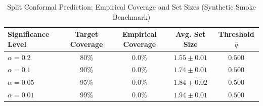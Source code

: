 \begin{table}[h]
\centering
\caption{Split Conformal Prediction: Empirical Coverage and Set Sizes (Synthetic Smoke Benchmark)}
\label{tab:conformal}
\begin{tabular}{lcccc}
\toprule
Significance Level & Target Coverage & Empirical Coverage & Avg. Set Size & Threshold $\hat{q}$ \\
\midrule
$\alpha=0.2$ & 80\% & $0.0\%$ & $1.55 \pm 0.01$ & $0.500$ \\
$\alpha=0.1$ & 90\% & $0.0\%$ & $1.74 \pm 0.01$ & $0.500$ \\
$\alpha=0.05$ & 95\% & $0.0\%$ & $1.84 \pm 0.02$ & $0.500$ \\
$\alpha=0.01$ & 99\% & $0.0\%$ & $1.94 \pm 0.01$ & $0.500$ \\
\bottomrule
\end{tabular}
\end{table}